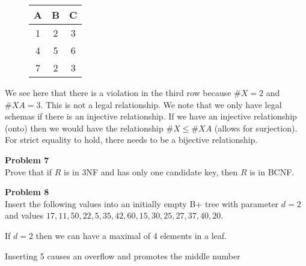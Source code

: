 \documentclass[12pt,letter]{article}
\newcommand{\problem}[1]{\vspace{3mm}\Large\textbf{{Problem
{#1}\vspace{3mm}}}\normalsize\\}
\begin{document}
\FloatBarrier
\begin{figure}[ht]
    \center
\begin{tabular}{|c|c|c|}
    \hline
    A & B & C \\
    \hline
    1 & 2 & 3 \\
    \hline
    4 & 5 & 6 \\
    \hline
    7 & 2 & 3 \\
    \hline
\end{tabular}
\end{figure}
\FloatBarrier

We see here that there is a violation in the third row because $\#X = 2$ and
$\#XA = 3$. This is not a legal relationship.  We note that we only have legal
schemas if there is an injective relationship. If we have an injective
relationship (onto) then we would have the relationship $\#X \leq \#XA$ (allows
for surjection). For strict equality to hold, there needs to be a bijective
relationship.


\problem{7}
Prove that if $R$ is in 3NF and has only one candidate key, then $R$ is in BCNF.

\problem{8}
Insert the following values into an initially empty B+ tree with parameter $d=2$
and values $17, 11, 50, 22, 5, 35, 42, 60, 15, 30, 25, 27, 37, 40, 20$.

If $d=2$ then we can have a maximal of 4 elements in a leaf.

\begin{figure}[ht]
    \center
\end{figure}
Inserting 5 causes an overflow and promotes the middle number
\begin{figure}[ht]
    \center
\end{figure}

\begin{figure}[ht]
    \center
\end{figure}
\end{document}
